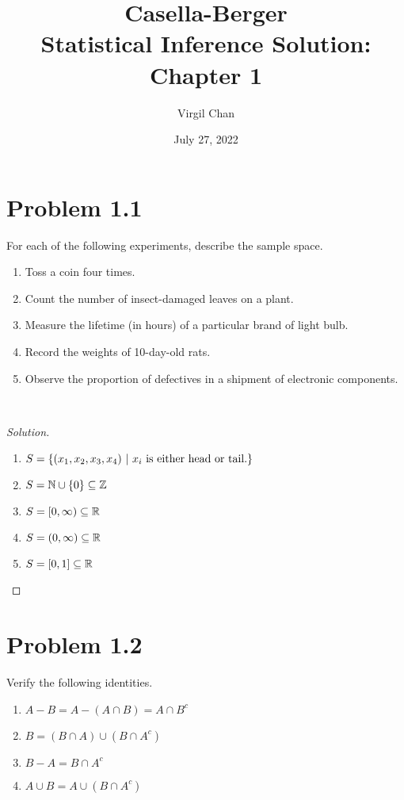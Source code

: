 \documentclass[12pt,letterpaper,reqno]{amsart}
\author{Virgil Chan}
\title{Casella-Berger \\ Statistical Inference Solution: \\ Chapter 1}
\date{July 27, 2022}
\numberwithin{equation}{subsection}
\begin{document}
\maketitle

\tableofcontents

\newpage
\section{Problem 1.1}

For each of the following experiments, describe the sample space.

\begin{enumerate}[label = (\alph*), leftmargin=*]
    \item Toss a coin four times.
    \item Count the number of insect-damaged leaves on a plant.
    \item Measure the lifetime (in hours) of a particular brand of light bulb.
    \item Record the weights of 10-day-old rats.
    \item Observe the proportion of defectives in a shipment of electronic components.
\end{enumerate}~\\

\begin{proof}[Solution]~\\

\begin{enumerate}[label= (\alph*), leftmargin=*]
    \item $S = \left\{ {(x_1, x_2, x_3, x_4)} \ \middle| \ {\mbox{$x_i$ is either head or tail.}} \right\}$
    \item $S = \mathbb{N} \cup \left\{ {0} \right\} \subseteq \mathbb{Z}$
    \item $S = [0, \infty) \subseteq \mathbb{R}$
    \item $S = (0, \infty) \subseteq \mathbb{R}$
    \item $S = [0, 1] \subseteq \mathbb{R}$
    
\end{enumerate}

\end{proof}

\newpage
\section{Problem 1.2} 

Verify the following identities.

\begin{enumerate}[label = (\alph*), leftmargin=*]
    \item $A - B = A - (A \cap B) = A \cap B^c$
    \item $B = (B \cap A) \cup (B \cap A^c)$
    \item $B - A = B \cap A^c$
    \item $A \cup B = A \cup (B \cap A^c)$
    
\end{enumerate}~\\
\end{document}
